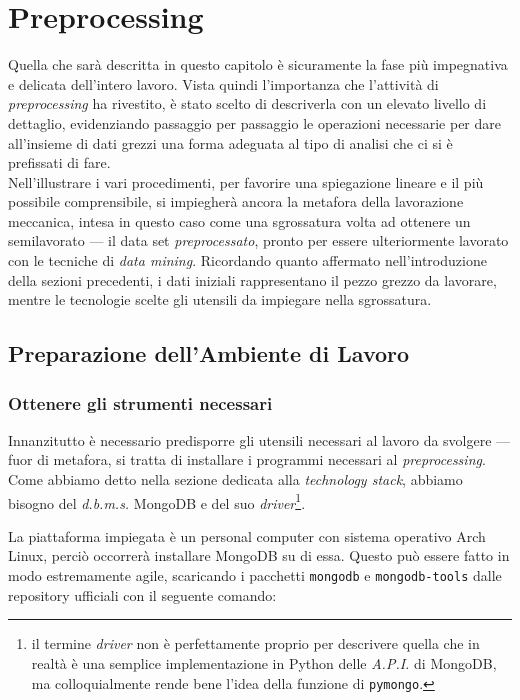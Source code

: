 \chapter{Preprocessing}
\label{ch:prepr}

Quella che sarà descritta in questo capitolo è sicuramente la fase più impegnativa e delicata dell'intero lavoro. Vista quindi l'importanza che l'attività di \textit{preprocessing} ha rivestito, è stato scelto di descriverla con un elevato livello di dettaglio, evidenziando passaggio per passaggio le operazioni necessarie per dare all'insieme di dati grezzi una forma adeguata al tipo di analisi che ci si è prefissati di fare. \\

Nell'illustrare i vari procedimenti, per favorire una spiegazione lineare e il più possibile comprensibile, si impiegherà ancora la metafora della lavorazione meccanica, intesa in questo caso come una sgrossatura volta ad ottenere un semilavorato --- il data set \textit{preprocessato}, pronto per essere ulteriormente lavorato con le tecniche di \textit{data mining}. Ricordando quanto affermato nell'introduzione della sezioni precedenti, i dati iniziali rappresentano il pezzo grezzo da lavorare, mentre le tecnologie scelte gli utensili da impiegare nella sgrossatura.

\section{Preparazione dell'Ambiente di Lavoro}

	\subsection{Ottenere gli strumenti necessari}

		Innanzitutto è necessario predisporre gli utensili necessari al lavoro da svolgere --- fuor di metafora, si tratta di installare i programmi necessari al \textit{preprocessing}. Come abbiamo detto nella sezione dedicata alla \textit{technology stack}, abbiamo bisogno del \textit{d.b.m.s.} MongoDB e del suo \textit{driver}\footnote{il termine \textit{driver} non è perfettamente proprio per descrivere quella che in realtà è una semplice implementazione in Python delle \textit{A.P.I.} di MongoDB, ma colloquialmente rende bene l'idea della funzione di \texttt{pymongo}.}.

		La piattaforma impiegata è un personal computer con sistema operativo Arch Linux, perciò occorrerà installare MongoDB su di essa. Questo può essere fatto in modo estremamente agile, scaricando i pacchetti \texttt{mongodb} e \texttt{mongodb-tools} dalle repository ufficiali con il seguente comando:


